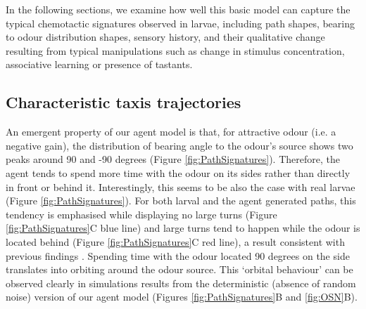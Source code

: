 \documentclass[11pt,a4paper]{article}
\newcommand{\todoML}[1]{\todo[author=ML,color=white, size=\tiny,inline]{#1}}
\begin{document}
In the following sections, we examine how well this basic model can capture the typical chemotactic signatures observed in larvae, including path shapes, bearing to odour distribution shapes, sensory history, and their qualitative change resulting from typical manipulations such as change in stimulus concentration, associative learning or presence of tastants. 

\subsection{Characteristic taxis trajectories}
An emergent property of our agent model is that, for attractive odour (i.e. a negative gain), the distribution of bearing angle to the odour's source shows two peaks around 90 and -90 degrees (Figure \ref{fig:PathSignatures}). Therefore, the agent tends to spend more time with the odour on its sides rather than directly in front or behind it. Interestingly, this seems to be also the case with real larvae (Figure \ref{fig:PathSignatures}).
 For both larval and the agent generated paths, this tendency is emphasised while displaying no large turns (Figure \ref{fig:PathSignatures}C blue line) and large turns tend to happen while the odour is located behind (Figure \ref{fig:PathSignatures}C red line), a result consistent with previous findings \cite{gomez2011active,schleyer2015impact}.
 Spending time with the odour located 90 degrees on the side translates into orbiting around the odour source. This ‘orbital behaviour’ can be observed clearly in simulations results from the deterministic (absence of random noise) version of our agent model (Figures \ref{fig:PathSignatures}B and \ref{fig:OSN}B).
\end{document}
